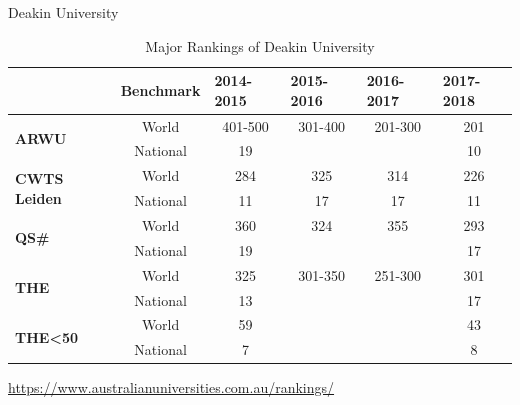 \documentclass[
 size=14pt,
 paper=smartboard,  %
 mode=present, 		%
 display=slides, 	%
 style=tuliplab,  	%
 pauseslide,
 fleqn,leqno]{powerdot}{}
\begin{document}


\begin{slide}[toc=,bm=]{Deakin University}
\begin{table}[htbp]
  \setlength{\abovecaptionskip}{-21pt}
  \setlength{\belowcaptionskip}{12pt}
  \centering
  \caption{Major Rankings of Deakin University}
    \begin{tabular}{l|c|cccc}
    \toprule
      & \textbf{Benchmark} & \multicolumn{1}{l}{\textbf{2014-2015}} & \multicolumn{1}{l}{\textbf{2015-2016}} & \multicolumn{1}{l}{\textbf{2016-2017}} & \multicolumn{1}{l}{\textbf{2017-2018}} \\ \midrule
    \multirow{2}[0]{*}{\textbf{ARWU}} & World & 401-500 & 301-400 & 201-300 & 201 \\
      & National  & 19 &   &   & 10 \\
      \midrule
    \multirow{2}[0]{*}{\textbf{CWTS Leiden}} & World  & 284 & 325 & 314 & 226 \\
      & National  & 11 & 17 & 17 & 11 \\
      \midrule
    \multirow{2}[0]{*}{\textbf{QS\#}} & World  & 360 & 324 & 355 & 293 \\
      & National & 19 &   &   & 17 \\
      \midrule
    \multirow{2}[0]{*}{\textbf{THE} } & World  & 325 & 301-350 & 251-300 & 301 \\
      & National  & 13 &   &   & 17 \\
      \midrule
    \multirow{2}[0]{*}{\textbf{THE<50}} & World  & 59 &   &   & 43 \\
      & National  & 7 &   &   & 8 \\
      \bottomrule
    \end{tabular}
  \label{tab:Deakin Ranking}
\end{table}
\centering
\url{https://www.australianuniversities.com.au/rankings/}
\end{slide}

\end{document}
